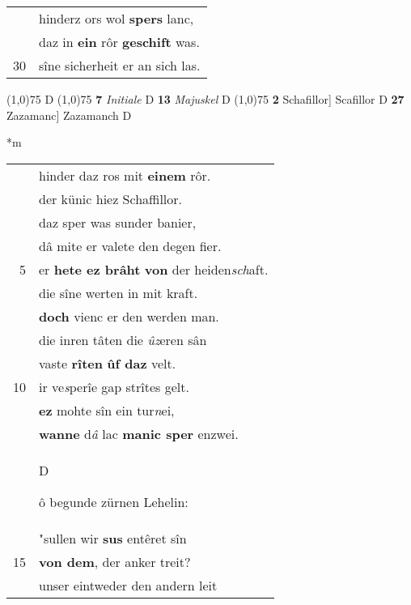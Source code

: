 \documentclass[8pt,a4paper,notitlepage]{article}
\begin{document}
\begin{table}[ht]
\begin{minipage}[t]{0.5\linewidth}
\begin{tabular}{rl}
 & hinderz ors wol \textbf{spers} lanc,\\ 
 & daz in \textbf{ein} rôr \textbf{geschift} was.\\ 
30 & sîne sicherheit er an sich las.\\ 
\end{tabular}
\scriptsize
\line(1,0){75} \newline
D \newline
\line(1,0){75} \newline
\textbf{7} \textit{Initiale} D  \textbf{13} \textit{Majuskel} D  \newline
\line(1,0){75} \newline
\textbf{2} Schafillor] Scafillor D \textbf{27} Zazamanc] Zazamanch D \newline
\end{minipage}
\hspace{0.5cm}
\begin{minipage}[t]{0.5\linewidth}
\small
\begin{center}*m
\end{center}
\begin{tabular}{rl}
 & hinder daz ros mit \textbf{einem} rôr.\\ 
 & der künic hiez Schaffillor.\\ 
 & daz sper was sunder banier,\\ 
 & dâ mite er valete den degen fier.\\ 
5 & er \textbf{hete ez brâht} \textbf{von} der heiden\textit{sch}aft.\\ 
 & die sîne werten in mit kraft.\\ 
 & \textbf{doch} vienc er den werden man.\\ 
 & die inren tâten die \textit{ûz}eren sân\\ 
 & vaste \textbf{rîten} \textbf{ûf daz} velt.\\ 
10 & ir ve\textit{s}perîe gap strîtes gelt.\\ 
 & \textbf{ez} mohte sîn ein tur\textit{n}ei,\\ 
 & \textbf{wanne} d\textit{â} lac \textbf{manic sper} enzwei.\\ 
 & \begin{large}D\end{large}ô begunde zürnen Lehelin:\\ 
 & "sullen wir \textbf{sus} entêret sîn\\ 
15 & \textbf{von dem}, der anker treit?\\ 
 & unser eintweder den andern leit\\ 

\end{tabular}
\end{minipage}
\end{table}
\end{document}
